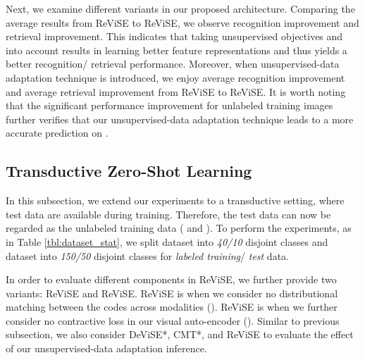 {{	Next, we examine different variants in our proposed architecture. Comparing the average results from ReViSE to ReViSE, we observe  recognition improvement and  retrieval improvement. This indicates that taking unsupervised objectives  and  into account results in learning better feature representations and thus yields a better recognition/ retrieval performance. Moreover, when unsupervised-data adaptation technique is introduced, we enjoy  average recognition improvement and  average retrieval improvement from ReViSE to ReViSE. It is worth noting that the significant performance improvement for unlabeled training images  further verifies that our unsupervised-data adaptation technique leads to a more accurate prediction on .
}

\subsection{Transductive Zero-Shot Learning}
\label{subsec:new_zero_learn}
{

	In this subsection, we extend our experiments to a transductive setting, where test data are available during training. Therefore, the test data can now be regarded as the unlabeled training data ( and ). To perform the experiments, as in Table \ref{tbl:dataset_stat}, we split  dataset into {\em 40/10} disjoint classes and  dataset into {\em 150/50} disjoint classes for {\em labeled training}/ {\em test} data.


	In order to evaluate different components in ReViSE, we further provide two variants: ReViSE and ReViSE. ReViSE is when we consider no distributional matching between the codes across modalities (). ReViSE is when we further consider no contractive loss in our visual auto-encoder (). Similar to previous subsection, we also consider DeViSE*, CMT*, and ReViSE to evaluate the effect of our unsupervised-data adaptation inference.





}}
